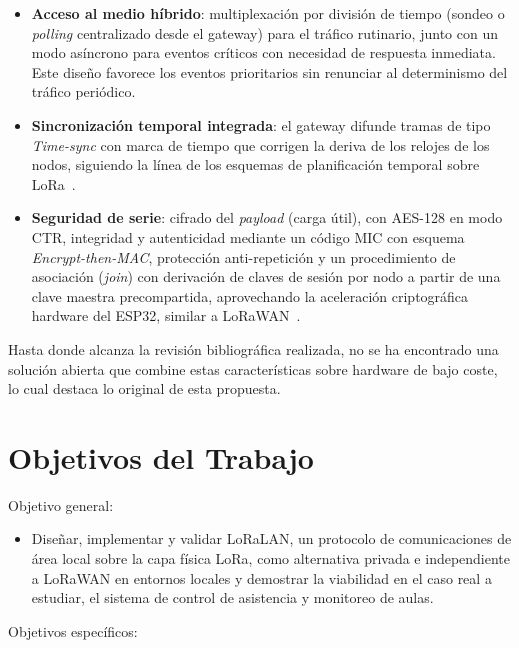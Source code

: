 \begin{itemize}
\item \textbf{Acceso al medio híbrido}: multiplexación por división de tiempo (sondeo o \textit{polling} centralizado desde el gateway) para el tráfico rutinario, junto con un modo asíncrono para eventos críticos con necesidad de respuesta inmediata. Este diseño favorece los eventos prioritarios sin renunciar al determinismo del tráfico periódico.

\item \textbf{Sincronización temporal integrada}: el gateway difunde tramas de tipo \textit{Time-sync} con marca de tiempo que corrigen la deriva de los relojes de los nodos, siguiendo la línea de los esquemas de planificación temporal sobre LoRa~\cite{farahani2026sdlora}.

\item \textbf{Seguridad de serie}: cifrado del \textit{payload} (carga útil), con AES-128 en modo CTR, integridad y autenticidad mediante un código MIC con esquema \textit{Encrypt-then-MAC}, protección anti-repetición y un procedimiento de asociación (\textit{join}) con derivación de claves de sesión por nodo a partir de una clave maestra precompartida, aprovechando la aceleración criptográfica hardware del ESP32, similar a LoRaWAN~\cite{iqbal2018aes}.
\end{itemize}

Hasta donde alcanza la revisión bibliográfica realizada, no se ha encontrado una solución abierta que combine estas características sobre hardware de bajo coste, lo cual destaca lo original de esta propuesta.

\section{Objetivos del Trabajo}


Objetivo general:

\begin{itemize}
    \item 
Diseñar, implementar y validar LoRaLAN, un protocolo de comunicaciones de área local sobre la capa física LoRa, como alternativa privada e independiente a LoRaWAN en entornos locales y demostrar la viabilidad en el caso real a estudiar, el sistema de control de asistencia y monitoreo de aulas.
\end{itemize}

Objetivos específicos:


